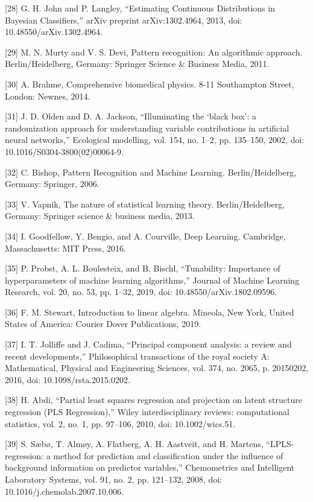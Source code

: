 \let\LaTeXcline\cline\documentclass[sn-mathphys-num]{sn-jnl}\let\cline\LaTeXcline
\begin{document}
[28] G. H. John and P. Langley, “Estimating Continuous Distributions in Bayesian Classifiers,” arXiv preprint arXiv:1302.4964, 2013, doi: 10.48550/arXiv.1302.4964.

[29] M. N. Murty and V. S. Devi, Pattern recognition: An algorithmic approach. Berlin/Heidelberg, Germany: Springer Science & Business Media, 2011.

[30] A. Brahme, Comprehensive biomedical physics. 8-11 Southampton Street, London: Newnes, 2014.

[31] J. D. Olden and D. A. Jackson, “Illuminating the ‘black box’: a randomization approach for understanding variable contributions in artificial neural networks,” Ecological modelling, vol. 154, no. 1–2, pp. 135–150, 2002, doi: 10.1016/S0304-3800(02)00064-9.

[32] C. Bishop, Pattern Recognition and Machine Learning. Berlin/Heidelberg, Germany: Springer, 2006.

[33] V. Vapnik, The nature of statistical learning theory. Berlin/Heidelberg, Germany: Springer science & business media, 2013.

[34] I. Goodfellow, Y. Bengio, and A. Courville, Deep Learning. Cambridge, Massachusetts: MIT Press, 2016.

[35] P. Probst, A. L. Boulesteix, and B. Bischl, “Tunability: Importance of hyperparameters of machine learning algorithms,” Journal of Machine Learning Research, vol. 20, no. 53, pp. 1–32, 2019, doi: 10.48550/arXiv.1802.09596.

[36] F. M. Stewart, Introduction to linear algebra. Mineola, New York, United States of America: Courier Dover Publications, 2019.

[37] I. T. Jolliffe and J. Cadima, “Principal component analysis: a review and recent developments,” Philosophical transactions of the royal society A: Mathematical, Physical and Engineering Sciences, vol. 374, no. 2065, p. 20150202, 2016, doi: 10.1098/rsta.2015.0202.

[38] H. Abdi, “Partial least squares regression and projection on latent structure regression (PLS Regression),” Wiley interdisciplinary reviews: computational statistics, vol. 2, no. 1, pp. 97–106, 2010, doi: 10.1002/wics.51.

[39] S. Sæbø, T. Almøy, A. Flatberg, A. H. Aastveit, and H. Martens, “LPLS-regression: a method for prediction and classification under the influence of background information on predictor variables,” Chemometrics and Intelligent Laboratory Systems, vol. 91, no. 2, pp. 121–132, 2008, doi: 10.1016/j.chemolab.2007.10.006.
\end{document}
